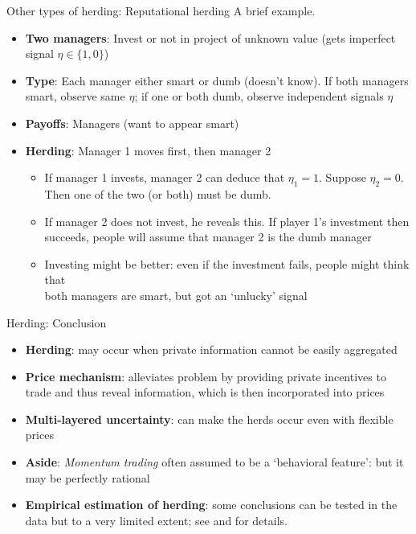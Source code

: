\documentclass[english,10pt
,aspectratio=169
]{beamer}
\begin{document}
\begin{frame}{Other types of herding: Reputational herding}
	A brief example.
	\begin{itemize}
		\item \textbf{Two  managers}: Invest or not in project of unknown value (gets imperfect signal $\eta \in \{1,0\}$)
		\item \textbf{Type}: Each manager either smart or dumb (doesn't know). If both managers smart, observe same $\eta$; if one or both dumb, observe independent signals $\eta$ %
		\item \textbf{Payoffs}:  Managers  (want to appear smart)
		\item \textbf{Herding}: Manager 1 moves first, then manager 2 
		\begin{itemize}
			\item If manager 1 invests, manager 2 can deduce that $\eta_1=1$. Suppose $\eta_2=0$. 
			\\ Then one of the two (or both) must be dumb. 
			\item If manager 2 does not invest, he reveals this. If player 1's investment then 
			\\succeeds, people will assume that manager 2 is the dumb manager
			\item Investing might be better: even if the investment fails, people might think that 
			\\both managers are smart, but got an `unlucky' signal
		\end{itemize}
	\end{itemize}
\end{frame}


\begin{frame}{Herding: Conclusion}
	\begin{itemize}
		\item \textbf{Herding}: may occur when private information cannot be easily aggregated
		\item \textbf{Price mechanism}: alleviates problem by providing private incentives to trade and thus reveal information, which is then incorporated into prices
		\item \textbf{Multi-layered uncertainty}: can make the herds occur even with flexible prices
		\item \textbf{Aside}: \emph{Momentum trading} often assumed to be a `behavioral feature': but it may be perfectly rational
		\item \textbf{Empirical estimation of herding}: some conclusions can be tested in the data but to a very limited extent; see \cite{bikhchandani_herd_2000} and \cite{bikhchandani_information_2024} for details.
	\end{itemize}
\end{frame}
\end{document}
